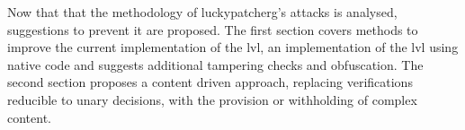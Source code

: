 Now that that the methodology of \gls{luckypatcherg}'s attacks is analysed, suggestions to prevent it are proposed.
\newline
The first section covers methods to improve the current implementation of the \gls{lvl}, an implementation of the \gls{lvl} using native code and suggests additional tampering checks and obfuscation.
\newline
The second section proposes a content driven approach, replacing verifications reducible to unary decisions, with the provision or withholding of complex content.
